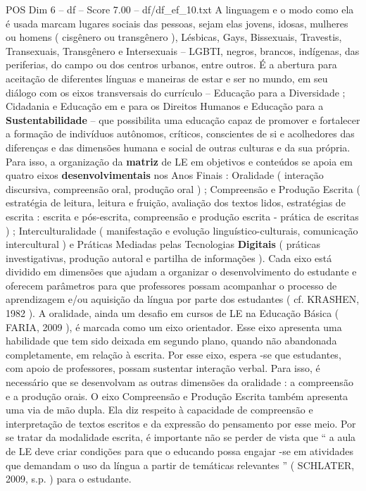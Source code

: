 \begin{textsample}{POS Dim 6 – df – Score 7.00 – df/df\_ef\_10.txt}
A linguagem e o modo como ela é usada marcam lugares sociais das pessoas, sejam elas jovens, idosas, mulheres ou homens ( cisgênero ou transgênero ), Lésbicas, Gays, Bissexuais, Travestis, Transexuais, Transgênero e Intersexuais – LGBTI, negros, brancos, indígenas, das periferias, do campo ou dos centros urbanos, entre outros.
É a abertura para aceitação de diferentes línguas e maneiras de estar e ser no mundo, em seu diálogo com os eixos transversais do currículo – Educação para a Diversidade ; Cidadania e Educação em e para os Direitos Humanos e Educação para a \textbf{Sustentabilidade} – que possibilita uma educação capaz de promover e fortalecer a formação de indivíduos autônomos, críticos, conscientes de si e acolhedores das diferenças e das dimensões humana e social de outras culturas e da sua própria.
Para isso, a organização da \textbf{matriz} de LE em objetivos e conteúdos se apoia em quatro eixos \textbf{desenvolvimentais} nos Anos Finais : Oralidade ( interação discursiva, compreensão oral, produção oral ) ; Compreensão e Produção Escrita ( estratégia de leitura, leitura e fruição, avaliação dos textos lidos, estratégias de escrita : escrita e pós-escrita, compreensão e produção escrita - prática de escritas ) ; Interculturalidade ( manifestação e evolução linguístico-culturais, comunicação intercultural ) e Práticas Mediadas pelas Tecnologias \textbf{Digitais} ( práticas investigativas, produção autoral e partilha de informações ).
Cada eixo está dividido em dimensões que ajudam a organizar o desenvolvimento do estudante e oferecem parâmetros para que professores possam acompanhar o processo de aprendizagem e/ou aquisição da língua por parte dos estudantes ( cf.
KRASHEN, 1982 ).
A oralidade, ainda um desafio em cursos de LE na Educação Básica ( FARIA, 2009 ), é marcada como um eixo orientador.
Esse eixo apresenta uma habilidade que tem sido deixada em segundo plano, quando não abandonada completamente, em relação à escrita.
Por esse eixo, espera -se que estudantes, com apoio de professores, possam sustentar interação verbal.
Para isso, é necessário que se desenvolvam as outras dimensões da oralidade : a compreensão e a produção orais.
O eixo Compreensão e Produção Escrita também apresenta uma via de mão dupla.
Ela diz respeito à capacidade de compreensão e interpretação de textos escritos e da expressão do pensamento por esse meio.
Por se tratar da modalidade escrita, é importante não se perder de vista que “ a aula de LE deve criar condições para que o educando possa engajar -se em atividades que demandam o uso da língua a partir de temáticas relevantes ” ( SCHLATER, 2009, s.p. ) para o estudante.

\end{textsample}
